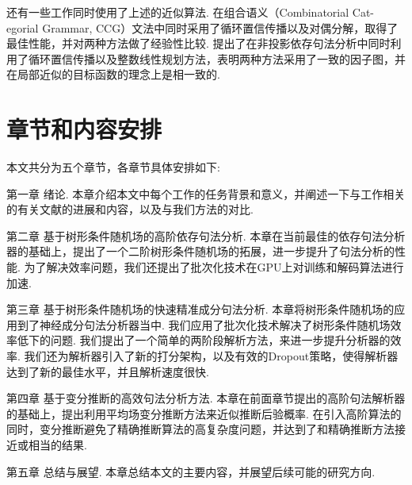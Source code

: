 还有一些工作同时使用了上述的近似算法.
\citet{auli-lopez-2011-comparison}在组合语义（Combinatorial Cat-egorial Grammar, CCG）文法中同时采用了循环置信传播\citep{smith-eisner-2008-dependency}以及对偶分解\citet{koo-etal-2010-dual}，取得了最佳性能，并对两种方法做了经验性比较.
\citet{martins-etal-2010-turbo}提出了在非投影依存句法分析中同时利用了循环置信传播\citep{smith-eisner-2008-dependency}以及整数线性规划\citep{martins-etal-2009-concise}方法，表明两种方法采用了一致的因子图，并在局部近似的目标函数的理念上是相一致的.

\section{章节和内容安排}

本文共分为五个章节，各章节具体安排如下:

第一章 绪论. 本章介绍本文中每个工作的任务背景和意义，并阐述一下与工作相关的有关文献的进展和内容，以及与我们方法的对比.

第二章 基于树形条件随机场的高阶依存句法分析.
本章在当前最佳的依存句法分析器的基础上，提出了一个二阶树形条件随机场的拓展，进一步提升了句法分析的性能.
为了解决效率问题，我们还提出了批次化技术在GPU上对训练和解码算法进行加速.

第三章 基于树形条件随机场的快速精准成分句法分析.
本章将树形条件随机场的应用到了神经成分句法分析器当中.
我们应用了批次化技术解决了树形条件随机场效率低下的问题.
我们提出了一个简单的两阶段解析方法，来进一步提升分析器的效率.
我们还为解析器引入了新的打分架构，以及有效的Dropout策略，使得解析器达到了新的最佳水平，并且解析速度很快.

第四章 基于变分推断的高效句法分析方法.
本章在前面章节提出的高阶句法解析器的基础上，提出利用平均场变分推断方法来近似推断后验概率.
在引入高阶算法的同时，变分推断避免了精确推断算法的高复杂度问题，并达到了和精确推断方法接近或相当的结果.

第五章 总结与展望. 本章总结本文的主要内容，并展望后续可能的研究方向.
